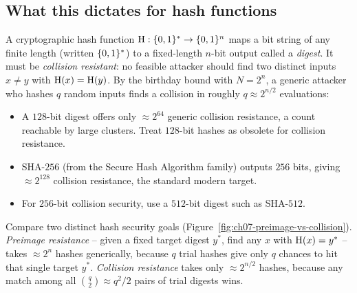 \subsection{What this dictates for hash functions}

A cryptographic hash function $\operatorname{H} : \{0,1\}^* \to \{0,1\}^n$ maps a bit string of any finite length (written $\{0,1\}^*$) to a fixed-length $n$-bit output called a \emph{digest}. It must be \emph{collision resistant}: no feasible attacker should find two distinct inputs $x \ne y$ with $\operatorname{H}(x) = \operatorname{H}(y)$. By the birthday bound with $N = 2^n$, a generic attacker who hashes $q$ random inputs finds a collision in roughly $q \approx 2^{n/2}$ evaluations:

\begin{itemize}
  \item A $128$-bit digest offers only $\approx 2^{64}$ generic collision resistance, a count reachable by large clusters. Treat $128$-bit hashes as obsolete for collision resistance.
  \item SHA-$256$ (from the Secure Hash Algorithm family) outputs $256$ bits, giving $\approx 2^{128}$ collision resistance, the standard modern target.
  \item For $256$-bit collision security, use a $512$-bit digest such as SHA-$512$.
\end{itemize}

Compare two distinct hash security goals (Figure~\ref{fig:ch07-preimage-vs-collision}). \emph{Preimage resistance} -- given a fixed target digest $y^*$, find any $x$ with $\operatorname{H}(x) = y^*$ -- takes $\approx 2^n$ hashes generically, because $q$ trial hashes give only $q$ chances to hit that single target $y^*$. \emph{Collision resistance} takes only $\approx 2^{n/2}$ hashes, because any match among all $\binom{q}{2} \approx q^2/2$ pairs of trial digests wins.

